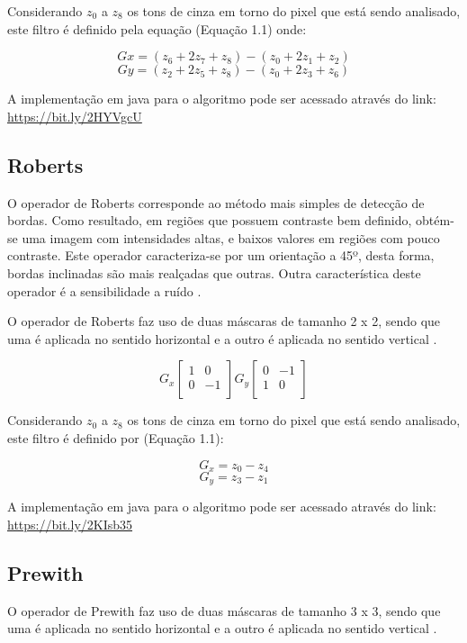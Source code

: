 \documentclass[
	12pt,				%
	oneside,			%
	a4paper,			%
	english,			%
	french,				%
	spanish,			%
	brazil,				%
	]{abntex2}
\begin{document}
Considerando \(z_0\) a \(z_8\) os tons de cinza em torno do pixel que está sendo analisado, este filtro é definido pela equação (Equação 1.1) onde:

\[Gx = (z_6 + 2z_7 + z_8) - (z_0 + 2z_1 + z_2)\]
\[Gy = (z_2 + 2z_5 + z_8) - (z_0 + 2z_3 + z_6)\]

A implementação em java para o algoritmo pode ser acessado através do link: \url{https://bit.ly/2HYVgcU}

\subsection{Roberts}
O operador de Roberts corresponde ao método mais simples de detecção de bordas. Como resultado, em regiões que possuem contraste bem definido, obtém-se uma imagem com intensidades altas, e baixos valores em regiões com pouco contraste. Este operador caracteriza-se por um orientação a 45º, desta forma, bordas inclinadas são mais realçadas que outras. Outra característica deste operador é a sensibilidade a ruído \cite{conciAzevedoLeta:2008}.

O operador de Roberts faz uso de duas máscaras de tamanho 2 x 2, sendo que uma é aplicada no sentido horizontal e a outro é aplicada no sentido vertical \cite{pedriniSchwartz:2008}.


\[
G_x
\begin{bmatrix}
    1 &  0    \\ 
	0 & -1    \\    
\end{bmatrix} 
G_y
\begin{bmatrix}
    0 & -1   \\ 
	1 &  0   \\    
\end{bmatrix} 
\]

Considerando \(z_0\) a \(z_8\) os tons de cinza em torno do pixel que está sendo analisado, este filtro é definido por (Equação 1.1):

\[G_x = z_0 - z_4\]
\[G_y = z_3 -z_1\]

A implementação em java para o algoritmo pode ser acessado através do link: \url{https://bit.ly/2KIsb35}
\subsection{Prewith}

O operador de Prewith faz uso de duas máscaras de tamanho 3 x 3, sendo que uma é aplicada no sentido horizontal e a outro é aplicada no sentido vertical \cite{pedriniSchwartz:2008}.	
\end{document}
